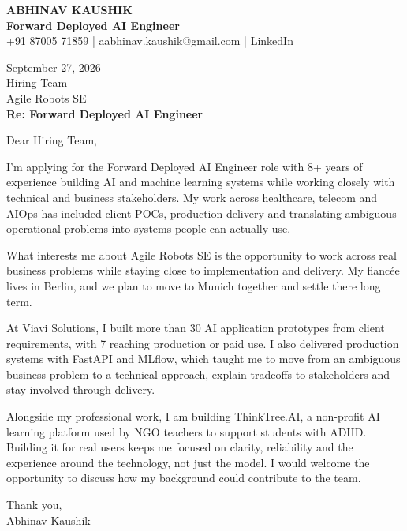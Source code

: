 \documentclass[10pt,a4paper]{article}
\begin{document}
\begin{center}
{\Large\bfseries ABHINAV KAUSHIK}\\[2pt]
{\bfseries Forward Deployed AI Engineer}\\[2pt]
+91 87005 71859 \quad | \quad aabhinav.kaushik@gmail.com \quad | \quad LinkedIn
\end{center}
\vspace{8pt}
September 27, 2026\\[6pt]
Hiring Team\\
Agile Robots SE\\[4pt]
\textbf{Re: Forward Deployed AI Engineer}

Dear Hiring Team,

I’m applying for the Forward Deployed AI Engineer role with 8+ years of experience building AI and machine learning systems while working closely with technical and business stakeholders. My work across healthcare, telecom and AIOps has included client POCs, production delivery and translating ambiguous operational problems into systems people can actually use.

What interests me about Agile Robots SE is the opportunity to work across real business problems while staying close to implementation and delivery. My fiancée lives in Berlin, and we plan to move to Munich together and settle there long term.

At Viavi Solutions, I built more than 30 AI application prototypes from client requirements, with 7 reaching production or paid use. I also delivered production systems with FastAPI and MLflow, which taught me to move from an ambiguous business problem to a technical approach, explain tradeoffs to stakeholders and stay involved through delivery.

Alongside my professional work, I am building ThinkTree.AI, a non-profit AI learning platform used by NGO teachers to support students with ADHD. Building it for real users keeps me focused on clarity, reliability and the experience around the technology, not just the model. I would welcome the opportunity to discuss how my background could contribute to the team.

Thank you,\\
Abhinav Kaushik
\end{document}
